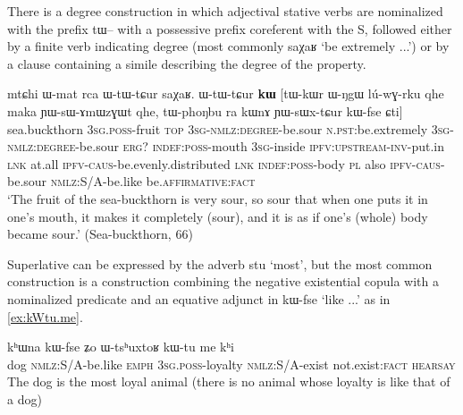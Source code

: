 \documentclass[oldfontcommands,oneside,a4paper,11pt]{article}
\newcommand{\ipa}[1]{{\phon#1}} %
\begin{document}
There is a degree construction in which adjectival stative verbs are nominalized with the prefix \ipa{tɯ--} with a possessive prefix coreferent with the S, followed either by a finite verb indicating degree (most commonly \ipa{saχaʁ} `be extremely ...') or by a clause containing a simile describing the degree of the property.


\begin{exe}
\ex \label{ex:YWsWxtCur}
\gll 
\ipa{mtɕhi}  	\ipa{ɯ-mat}  	\ipa{rca}  	\ipa{ɯ-tɯ-tɕur}  	\ipa{saχaʁ.}  	\ipa{ɯ-tɯ-tɕur}  	\ipa{\textbf{kɯ}}  	[\ipa{tɯ-kɯr}  	\ipa{ɯ-ŋgɯ}  	\ipa{lú-wɣ-rku}  	\ipa{qhe}  	\ipa{maka}  	\ipa{ɲɯ-sɯ-ɤmɯzɣɯt}  	\ipa{qhe,}  	\ipa{tɯ-phoŋbu}  	\ipa{ra}  	\ipa{kɯnɤ}  	\ipa{ɲɯ-sɯx-tɕur}  	\ipa{kɯ-fse}  	\ipa{ɕti}]  \\
sea.buckthorn \textsc{3sg.poss}-fruit \textsc{top} \textsc{3sg-nmlz:degree}-be.sour \textsc{n.pst}:be.extremely \textsc{3sg-nmlz:degree}-be.sour \textsc{erg?} \textsc{indef:poss}-mouth \textsc{3sg}-inside \textsc{ipfv:upstream-inv}-put.in \textsc{lnk} at.all \textsc{ipfv-caus}-be.evenly.distributed \textsc{lnk} \textsc{indef:poss}-body \textsc{pl} also \textsc{ipfv-caus}-be.sour \textsc{nmlz:S/A}-be.like  be.\textsc{affirmative}:\textsc{fact} \\
\glt `The fruit of the sea-buckthorn is very sour, so sour that when one puts it in one's mouth, it makes it completely (sour), and it is as if one's (whole) body became sour.' (Sea-buckthorn, 66)
\end{exe}

Superlative can be expressed by the adverb \ipa{stu} `most', but the most common construction is a construction combining the negative existential copula with a nominalized predicate and an equative adjunct in \ipa{kɯ-fse} `like ...' as in \ref{ex:kWtu.me}.

\begin{exe}
\ex \label{ex:kWtu.me}
\gll 
\ipa{kʰɯna}  	\ipa{kɯ-fse}  	\ipa{ʑo} 	\ipa{ɯ-tsʰuxtoʁ}  	\ipa{kɯ-tu}  	\ipa{me}  	\ipa{kʰi} \\  
dog \textsc{nmlz}:S/A-be.like  \textsc{emph} \textsc{3sg.poss}-loyalty \textsc{nmlz}:S/A-exist  not.exist:\textsc{fact} \textsc{hearsay} \\
\glt The dog is the most loyal animal (there is no animal whose loyalty is like that of a dog)
\end{exe}

%
\end{document}
